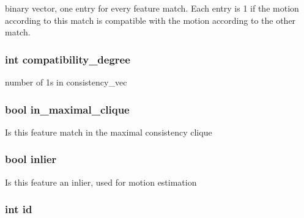 \label{classfovis_1_1FeatureMatch_a92a84284bf0e8709364e0250c1063257}
binary vector, one entry for every feature match. Each entry is 1 if the motion according to this match is compatible with the motion according to the other match. \hypertarget{classfovis_1_1FeatureMatch_ae5fb6416f0d1fa278a22570505e05e13}{
\subsubsection[{compatibility\_\-degree}]{\setlength{\rightskip}{0pt plus 5cm}int {\bf compatibility\_\-degree}}}
\label{classfovis_1_1FeatureMatch_ae5fb6416f0d1fa278a22570505e05e13}
number of 1s in consistency\_\-vec \hypertarget{classfovis_1_1FeatureMatch_ab94bc799c5558ad8bcc29d94b478f292}{
\subsubsection[{in\_\-maximal\_\-clique}]{\setlength{\rightskip}{0pt plus 5cm}bool {\bf in\_\-maximal\_\-clique}}}
\label{classfovis_1_1FeatureMatch_ab94bc799c5558ad8bcc29d94b478f292}
Is this feature match in the maximal consistency clique \hypertarget{classfovis_1_1FeatureMatch_af5eefbf5c8382030e20e4a7ae064987f}{
\subsubsection[{inlier}]{\setlength{\rightskip}{0pt plus 5cm}bool {\bf inlier}}}
\label{classfovis_1_1FeatureMatch_af5eefbf5c8382030e20e4a7ae064987f}
Is this feature an inlier, used for motion estimation \hypertarget{classfovis_1_1FeatureMatch_a7441ef0865bcb3db9b8064dd7375c1ea}{
\subsubsection[{id}]{\setlength{\rightskip}{0pt plus 5cm}int {\bf id}}}
\label{classfovis_1_1FeatureMatch_a7441ef0865bcb3db9b8064dd7375c1ea}
